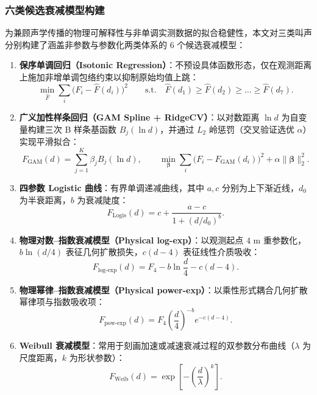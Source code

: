 \documentclass{apmcmthesis}
\begin{document}
\subsubsection{六类候选衰减模型构建}

为兼顾声学传播的物理可解释性与非单调实测数据的拟合稳健性，本文对三类叫声分别构建了涵盖非参数与参数化两类体系的 $6$ 个候选衰减模型：
\begin{enumerate}
    \item \textbf{保序单调回归（Isotonic Regression）}：不预设具体函数形态，仅在观测距离上施加非增单调包络约束以抑制原始均值上跳：
    \begin{equation}
        \min_{\hat{F}} \sum_{i} \bigl(F_i - \hat{F}(d_i)\bigr)^2 \qquad \text{s.t.}\quad \hat{F}(d_1) \ge \hat{F}(d_2) \ge \dots \ge \hat{F}(d_7).
    \end{equation}
    \item \textbf{广义加性样条回归（GAM Spline + RidgeCV）}：以对数距离 $\ln d$ 为自变量构建三次 B 样条基函数 $B_j(\ln d)$，并通过 $L_2$ 岭惩罚（交叉验证选优 $\alpha$）实现平滑拟合：
    \begin{equation}
        F_{\text{GAM}}(d) = \sum_{j=1}^{K} \beta_j B_j(\ln d), \qquad
        \min_{\boldsymbol{\beta}} \sum_{i}\bigl(F_i - F_{\text{GAM}}(d_i)\bigr)^2 + \alpha \|\boldsymbol{\beta}\|_2^2.
    \end{equation}
    \item \textbf{四参数 Logistic 曲线}：有界单调递减曲线，其中 $a, c$ 分别为上下渐近线，$d_0$ 为半衰距离，$b$ 为衰减陡度：
    \begin{equation}
        F_{\text{Logis}}(d) = c + \frac{a - c}{1 + (d / d_0)^b}.
    \end{equation}
    \item \textbf{物理对数--指数衰减模型（Physical log-exp）}：以观测起点 $4\text{ m}$ 重参数化，$b\ln(d/4)$ 表征几何扩散损失，$c(d-4)$ 表征线性介质吸收：
    \begin{equation}
        F_{\text{log-exp}}(d) = F_4 - b\ln\frac{d}{4} - c(d - 4).
    \end{equation}
    \item \textbf{物理幂律--指数衰减模型（Physical power-exp）}：以乘性形式耦合几何扩散幂律项与指数吸收项：
    \begin{equation}
        F_{\text{pow-exp}}(d) = F_4\left(\frac{d}{4}\right)^{-b} e^{-c(d - 4)}.
    \end{equation}
    \item \textbf{Weibull 衰减模型}：常用于刻画加速或减速衰减过程的双参数分布曲线（$\lambda$ 为尺度距离，$k$ 为形状参数）：
    \begin{equation}
        F_{\text{Weib}}(d) = \exp\!\left[-\left(\frac{d}{\lambda}\right)^k\right].
    \end{equation}
\end{enumerate}
\end{document}
